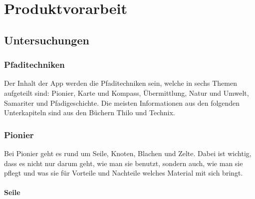 \chapter{Produktvorarbeit}
\section{Untersuchungen}
\subsection{Pfaditechniken}

Der Inhalt der App werden die Pfaditechniken sein, welche in sechs Themen aufgeteilt sind: Pionier, Karte und Kompass, Übermittlung, Natur und Umwelt, Samariter und Pfadigeschichte. Die meisten Informationen aus den folgenden Unterkapiteln sind aus den Büchern Thilo\cite{noauthor_thilo_2014} und Technix\cite{muller_technix_2007}.

\subsection*{Pionier}

Bei Pionier geht es rund um Seile, Knoten, Blachen und Zelte. Dabei ist wichtig, dass es nicht nur darum geht, wie man sie benutzt, sondern auch, wie man sie pflegt und was sie für Vorteile und Nachteile welches Material mit sich bringt.

\subsubsection*{Seile}

